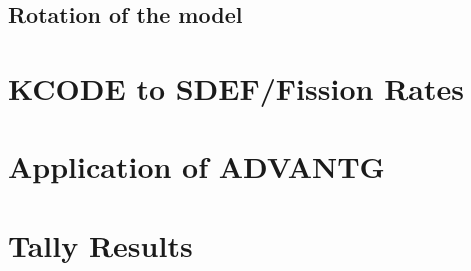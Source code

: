 \subsection{Rotation of the model}


\section{KCODE to SDEF/Fission Rates}

\section{Application of ADVANTG}

\section{Tally Results}
